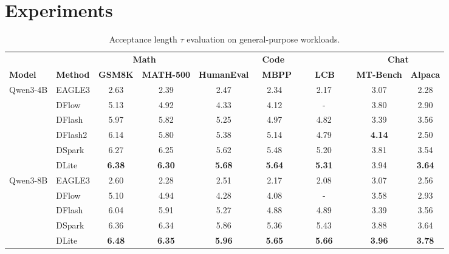 \section{Experiments}
\begin{table}[!t]
\centering
\caption{Acceptance length $\tau$ evaluation on general-purpose workloads.}
\label{tab:acceptance_length}
\small
\setlength{\tabcolsep}{4.2pt} %
\renewcommand{\arraystretch}{1.1}
\begin{tabular}{llccccccc} %
\toprule
& & \multicolumn{2}{c}{\textbf{Math}} & \multicolumn{3}{c}{\textbf{Code}} & \multicolumn{2}{c}{\textbf{Chat}} \\ %
\cmidrule(lr){3-4} \cmidrule(lr){5-7} \cmidrule(lr){8-9}          %
\textbf{Model} & \textbf{Method} & \textbf{GSM8K} & \textbf{MATH-500} & \textbf{HumanEval} & \textbf{\ MBPP} & \textbf{\ \ \ LCB \ \ } & \textbf{MT-Bench} & \textbf{Alpaca} \\
\midrule
\multirow{6}{*}{Qwen3-4B}   & EAGLE3 & 2.63 & 2.39 & 2.47 & 2.34 & 2.17 & 3.07 & 2.28 \\
                            & DFlow  & 5.13 & 4.92 & 4.33 & 4.12 & - & 3.80 & 2.90 \\
                            & DFlash    & 5.97 & 5.82 & 5.25 & 4.97 & 4.82 & 3.39 & 3.56 \\
                            & DFlash2    & 6.14 & 5.80 & 5.38 & 5.14 & 4.79 & \textbf{4.14} & 2.50 \\
                            & DSpark    & 6.27 & 6.25 & 5.62 & 5.48 & 5.20  & 3.81 & 3.54 \\
                            & DLite     & \textbf{6.38} & \textbf{6.30} & \textbf{5.68} & \textbf{5.64} & \textbf{5.31} & 3.94 & \textbf{3.64} \\
\midrule
\multirow{5}{*}{Qwen3-8B}   & EAGLE3 & 2.60 & 2.28 & 2.51 & 2.17 & 2.08 & 3.07 & 2.56 \\
                            & DFlow  & 5.10 & 4.94 & 4.28 & 4.08 & - & 3.58 & 2.93 \\
                            & DFlash    & 6.04 & 5.91 & 5.27 & 4.88 & 4.89 & 3.39 & 3.56 \\
                            & DSpark    & 6.36 & 6.34 & 5.86 & 5.36 & 5.43 & 3.88 & 3.64 \\
                            & DLite     & \textbf{6.48} & \textbf{6.35} & \textbf{5.96} & \textbf{5.65} & \textbf{5.66} & \textbf{3.96} & \textbf{3.78} \\
\bottomrule
\end{tabular}
\end{table}



